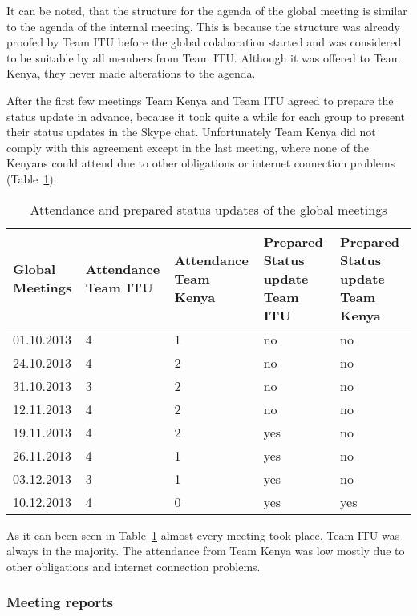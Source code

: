 It can be noted, that the structure for the agenda of the global meeting is similar to the agenda of the internal meeting. This is because the structure was already proofed by Team ITU before the global colaboration started and was considered to be suitable by all members from Team ITU. Although it was offered to Team Kenya, they never made alterations to the agenda.

After the first few meetings Team Kenya and Team ITU agreed to prepare the status update in advance, because it took quite a while for each group to present their status updates in the Skype chat. Unfortunately Team Kenya did not comply with this agreement except in the last meeting, where none of the Kenyans could attend due to other obligations or internet connection problems (Table~\ref{tab:global_meetings}).

\begin{table}[htb]
	\centering
	\begin{tabular}{ | l |  p{2.5cm} |  p{2.5cm} |  p{3cm} |  p{3cm} |}
    		\hline
   		Global Meetings & Attendance Team ITU &  Attendance Team Kenya & Prepared Status update Team ITU & Prepared Status update Team Kenya\\ \hline
    		01.10.2013 & 4 & 1 & no & no \\ \hline
    		24.10.2013 & 4 & 2 & no & no \\ \hline
    		31.10.2013 & 3 & 2 & no & no \\ \hline
    		12.11.2013 & 4 & 2 & no & no \\ \hline
    		19.11.2013 & 4 & 2 & yes & no \\ \hline
    		26.11.2013 & 4 & 1 & yes & no \\ \hline
    		03.12.2013 & 3 & 1 & yes & no \\ \hline
    		10.12.2013 & 4 & 0 & yes & yes \\ \hline
	\end{tabular}
	\caption{Attendance and prepared status updates of the global meetings}
	\label{tab:global_meetings}
\end{table}

As it can been seen in Table~\ref{tab:global_meetings} almost every meeting took place. Team ITU was always in the majority. The attendance from Team Kenya was low mostly due to other obligations and internet connection problems.

\subsubsection {Meeting reports}

